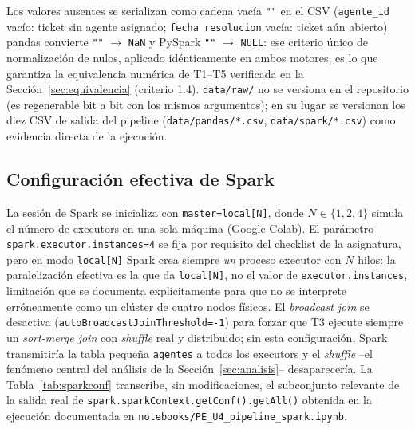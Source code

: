 \documentclass[11pt,a4paper]{article}
\begin{document}
Los valores ausentes se serializan como cadena vac\'ia \texttt{""} en el CSV
(\texttt{agente\_id} vac\'io: ticket sin agente asignado; \texttt{fecha\_resolucion}
vac\'ia: ticket a\'un abierto). pandas convierte \texttt{""} $\to$
\texttt{NaN} y PySpark \texttt{""} $\to$ \texttt{NULL}: ese criterio \'unico
de normalizaci\'on de nulos, aplicado id\'enticamente en ambos motores, es lo
que garantiza la equivalencia num\'erica de T1--T5 verificada en la
Secci\'on~\ref{sec:equivalencia} (criterio 1.4). \texttt{data/raw/} no se
versiona en el repositorio (es regenerable bit a bit con los mismos
argumentos); en su lugar se versionan los diez CSV de salida del pipeline
(\texttt{data/pandas/*.csv}, \texttt{data/spark/*.csv}) como evidencia
directa de la ejecuci\'on.


\subsection{Configuraci\'on efectiva de Spark}
\label{sec:config-spark}

La sesi\'on de Spark se inicializa con \texttt{master=local[N]}, donde $N \in
\{1,2,4\}$ simula el n\'umero de executors en una sola m\'aquina (Google
Colab). El par\'ametro \texttt{spark.executor.instances=4} se fija por
requisito del checklist de la asignatura, pero en modo \texttt{local[N]}
Spark crea siempre \emph{un} proceso executor con $N$ hilos: la
paralelizaci\'on efectiva es la que da \texttt{local[N]}, no el valor de
\texttt{executor.instances}, limitaci\'on que se documenta expl\'icitamente
para que no se interprete err\'oneamente como un cl\'uster de cuatro nodos
f\'isicos. El \emph{broadcast join} se desactiva
(\texttt{autoBroadcastJoinThreshold=-1}) para forzar que T3 ejecute siempre
un \emph{sort-merge join} con \emph{shuffle} real y distribuido; sin esta
configuraci\'on, Spark transmitir\'ia la tabla peque\~na \texttt{agentes} a
todos los executors y el \emph{shuffle} --el fen\'omeno central del
an\'alisis de la Secci\'on~\ref{sec:analisis}-- desaparecer\'ia. La
Tabla~\ref{tab:sparkconf} transcribe, sin modificaciones, el subconjunto
relevante de la salida real de \texttt{spark.sparkContext.getConf().getAll()}
obtenida en la ejecuci\'on documentada en \texttt{notebooks/PE\_U4\_pipeline\_spark.ipynb}.
\end{document}
